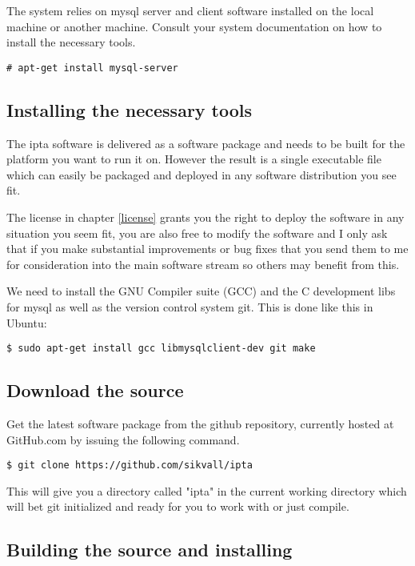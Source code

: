 \documentclass[english,twoside,openright,a4paper,12pt]{article}
\begin{document}
The system relies on mysql server and client software installed on the local machine or another machine. Consult your system documentation on how to install the necessary tools.

\begin{verbatim}
# apt-get install mysql-server
\end{verbatim}

\subsection{Installing the necessary tools}

The ipta software is delivered as a software package and needs to be built for the platform you want to run it on. However the result is a single executable file which can easily be packaged and deployed in any software distribution you see fit.

The license in chapter \ref{license} grants you the right to deploy the software in any situation you seem fit, you are also free to modify the software and I only ask that if you make substantial improvements or bug fixes that you send them to me for consideration into the main software stream so others may benefit from this.

We need to install the GNU Compiler suite (GCC) and the C development libs for mysql as well as the version control system git. This is done like this in Ubuntu:

\begin{verbatim}
$ sudo apt-get install gcc libmysqlclient-dev git make
\end{verbatim}

\subsection{Download the source}

Get the latest software package from the github repository, currently hosted at GitHub.com by issuing the following command.

\begin{verbatim}
$ git clone https://github.com/sikvall/ipta
\end{verbatim}

This will give you a directory called "ipta" in the current working directory which will bet git initialized and ready for you to work with or just compile.

\subsection{Building the source and installing}
\end{document}
